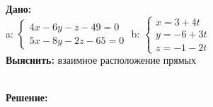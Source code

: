 \documentclass{article}
\begin{document}
\begin{minipage}[t]{0.45\textwidth}

\textbf{Дано:}\\ 
a: \begin{math}
  \begin{cases}
    
  4x - 6y - z - 49 = 0 \\ 
  5x - 8y -2z - 65 = 0
  \end{cases}
\end{math}
b: \begin{math}
  \begin{cases}
    x = 3 + 4t\\ 
    y = -6 + 3t\\ 
    z = -1 - 2t
  \end{cases}
\end{math}\\ 
\textbf{Выяснить: }взаимное расположение прямых\\
\end{minipage}
\begin{minipage}[t]{0.45\textwidth}
  \vspace{-\baselineskip} %

\begin{center}
\end{center}
\end{minipage}
\\
\textbf{Решение:}
\end{document}
